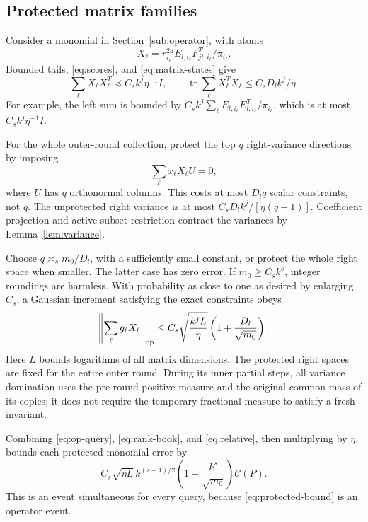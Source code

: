 \documentclass[11pt]{article}
\theoremstyle{remark}\newtheorem{remark}[theorem]{Remark}
\newcommand{\tr}{\operatorname{tr}}\newcommand{\rank}{\operatorname{rank}}
\newcommand{\norm}[1]{\left\|#1\right\|}\newcommand{\ip}[2]{\left\langle #1,#2\right\rangle}
\newcommand{\cost}{\mathcal C}\newcommand{\OPT}{\mathsf{OPT}}
\begin{document}
\subsection{Protected matrix families}
Consider a monomial in Section~\ref{sub:operator}, with atoms
\[
 X_\ell=r_{i_\ell}^{2d}E_{l,i_\ell}F_{jt,i_\ell}^T/\pi_{i_\ell}.
\]
Bounded tails, \eqref{eq:scores}, and \eqref{eq:matrix-states} give
\begin{equation}\label{eq:prot-variance}
 \sum_\ell X_\ell X_\ell^T\preceq C_s k^j\eta^{-1}I,
 \qquad \tr\sum_\ell X_\ell^TX_\ell\le C_s D_l k^j/\eta.
\end{equation}
For example, the left sum is bounded by $C_s k^j\sum_\ell E_{l,i_\ell}E_{l,i_\ell}^T/\pi_{i_\ell}$, which is at most $C_s k^j\eta^{-1}I$.

For the whole outer-round collection, protect the top $q$ right-variance directions by imposing
\begin{equation}\label{eq:protect}
 \sum_\ell x_\ell X_\ell U=0,
\end{equation}
where $U$ has $q$ orthonormal columns. This costs at most $D_lq$ scalar constraints, not $q$. The unprotected right variance is at most $C_s D_l k^j/[\eta(q+1)]$. Coefficient projection and active-subset restriction contract the variances by Lemma~\ref{lem:variance}.

Choose $q\asymp_s m_0/D_l$, with a sufficiently small constant, or protect the whole right space when smaller. The latter case has zero error. If $m_0\ge C_s k^s$, integer roundings are harmless. With probability as close to one as desired by enlarging $C_s$, a Gaussian increment satisfying the exact constraints obeys
\begin{equation}\label{eq:protected-bound}
 \norm{\sum_\ell g_\ell X_\ell}_{\op}
 \le C_s\sqrt{\frac{k^j L}{\eta}}\left(1+\frac{D_l}{\sqrt{m_0}}\right).
\end{equation}
Here $L$ bounds logarithms of all matrix dimensions. The protected right spaces are fixed for the entire outer round. During its inner partial steps, all variance domination uses the pre-round positive measure and the original common mass of its copies; it does not require the temporary fractional measure to satisfy a fresh invariant.

Combining \eqref{eq:op-query}, \eqref{eq:rank-book}, and \eqref{eq:relative}, then multiplying by $\eta$, bounds each protected monomial error by
\begin{equation}\label{eq:prot-error}
 C_s\sqrt{\eta L}\,k^{(s-1)/2}\left(1+\frac{k^s}{\sqrt{m_0}}\right)\cost(P).
\end{equation}
This is an event simultaneous for every query, because \eqref{eq:protected-bound} is an operator event.
\end{document}
